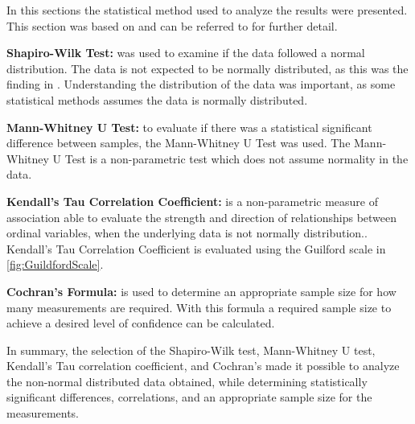 

In this sections the statistical method used to analyze the results were presented. This section was based on \cite{biksbois} and can be referred to for further detail.\newline %


\noindent\textbf{Shapiro-Wilk Test:} was used to examine if the data followed a normal distribution. %
The data is not expected to be normally distributed, as this was the finding in \cite{biksbois}. Understanding the distribution of the data was important, as some statistical methods assumes the data is normally distributed.\cite{razali2011power}\newline

\noindent\textbf{Mann-Whitney U Test:}
to evaluate if there was a statistical significant difference between samples, the Mann-Whitney U Test was used. The Mann-Whitney U Test is a non-parametric test which does not assume normality in the data.\cite{mann1947test}\newline


\noindent\textbf{Kendall's Tau Correlation Coefficient:} is a non-parametric measure of association able to evaluate the strength and direction of relationships between ordinal variables, when the underlying data is not normally distribution.\cite{han1987non}. Kendall's Tau Correlation Coefficient is evaluated using the Guilford scale in \cref{fig:GuildfordScale}.\cite[219]{guilford1950fundamental}\newline



\noindent\textbf{Cochran's Formula:}
is used to determine an appropriate sample size for how many measurements are required. With this formula a required sample size to achieve a desired level of confidence can be calculated.\cite{Cochran}\newline

\noindent In summary, the selection of the Shapiro-Wilk test, Mann-Whitney U test, Kendall's Tau correlation coefficient, and Cochran's made it possible to analyze the non-normal distributed data obtained, while determining statistically significant differences, correlations, and an appropriate sample size for the measurements.
